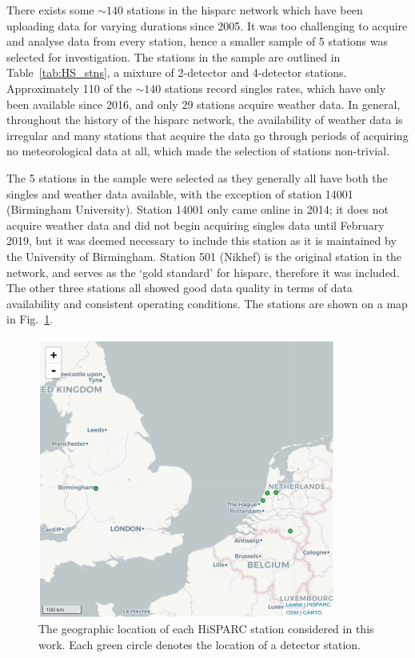 There exists some $\sim 140$ stations in the \gls{hisparc} network \citep{van_dam_hisparc_2020} which have been uploading data for varying durations since 2005. It was too challenging to acquire and analyse data from every station, hence a smaller sample of 5 stations was selected for investigation. The stations in the sample are outlined in Table~\ref{tab:HS_stns}, a mixture of 2-detector and 4-detector stations. Approximately 110 of the $\sim 140$ stations record singles rates, which have only been available since 2016, and only 29 stations acquire weather data. In general, throughout the history of the \gls{hisparc} network, the availability of weather data is irregular and many stations that acquire the data go through periods of acquiring no meteorological data at all, which made the selection of stations non-trivial. 

The 5 stations in the sample were selected as they generally all have both the singles and weather data available, with the exception of station 14001 (Birmingham University). Station 14001 only came online in 2014; it does not acquire weather data and did not begin acquiring singles data until February 2019, but it was deemed necessary to include this station as it is maintained by the University of Birmingham. Station 501 (Nikhef) is the original station in the network, and serves as the `gold standard' for \gls{hisparc}, therefore it was included. The other three stations all showed good data quality in terms of data availability and consistent operating conditions. The stations are shown on a map in Fig.~\ref{fig:HS_map}.


\begin{figure}[ht!]
	\centering
	\includegraphics[width=0.75\columnwidth]{HS_station_map.pdf}
	\caption{The geographic location of each HiSPARC station considered in this work. Each green circle denotes the location of a detector station.}
	\label{fig:HS_map}
\end{figure}


